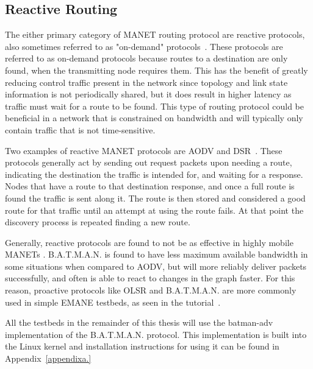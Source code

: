 \subsection{Reactive Routing}
The either primary category of MANET routing protocol are reactive protocols, also sometimes referred to as "on-demand" protocols~\cite{manet_survey}.
These protocols are referred to as on-demand protocols because routes to a destination are only found, when the transmitting node requires them.
This has the benefit of greatly reducing control traffic present in the network since topology and link state information is not periodically shared, but it does result in higher latency as traffic must wait for a route to be found.
This type of routing protocol could be beneficial in a network that is constrained on bandwidth and will typically only contain traffic that is not time-sensitive.\par
Two examples of reactive MANET protocols are AODV and DSR~\cite{reactive_routing}.
These protocols generally act by sending out request packets upon needing a route, indicating the destination the traffic is intended for, and waiting for a response.
Nodes that have a route to that destination response, and once a full route is found the traffic is sent along it.
The route is then stored and considered a good route for that traffic until an attempt at using the route fails.
At that point the discovery process is repeated finding a new route.\par
Generally, reactive protocols are found to not be as effective in highly mobile MANETs \cite{aodv_batman,reactive_routing}.
B.A.T.M.A.N. is found to have less maximum available bandwidth in some situations when compared to AODV, but will more reliably deliver packets successfully, and often is able to react to changes in the graph faster.
For this reason, proactive protocols like OLSR and B.A.T.M.A.N. are more commonly used in simple EMANE testbeds, as seen in the tutorial~\cite{emane_tutorial}.\par
All the testbeds in the remainder of this thesis will use the batman-adv implementation of the B.A.T.M.A.N. protocol.
This implementation is built into the Linux kernel and installation instructions for using it can be found in Appendix~\ref{appendixa.}

